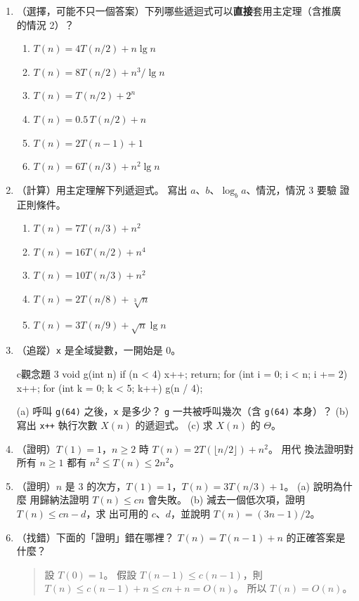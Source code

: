 \begin{enumerate}
\item （選擇，可能不只一個答案）下列哪些遞迴式可以\textbf{直接}套用主定理（含推廣
的情況 2）？
\begin{enumerate}
\item $T(n) = 4T(n/2) + n \lg n$
\item $T(n) = 8T(n/2) + n^3 / \lg n$
\item $T(n) = T(n/2) + 2^n$
\item $T(n) = 0.5\, T(n/2) + n$
\item $T(n) = 2T(n-1) + 1$
\item $T(n) = 6T(n/3) + n^2 \lg n$
\end{enumerate}

\item （計算）用主定理解下列遞迴式。 寫出 $a$、$b$、$\log_b a$、情況，情況 3 要驗
證正則條件。
\begin{enumerate}
\item $T(n) = 7T(n/3) + n^2$
\item $T(n) = 16T(n/2) + n^4$
\item $T(n) = 10T(n/3) + n^2$
\item $T(n) = 2T(n/8) + \sqrt[3]{n}$
\item $T(n) = 3T(n/9) + \sqrt{n} \lg n$
\end{enumerate}

\item （追蹤）\texttt{x} 是全域變數，一開始是 $0$。
\begin{code}{c}{觀念題 3}
void g(int n)
{
    if (n < 4) {
        x++;
        return;
    }
    for (int i = 0; i < n; i += 2)
        x++;
    for (int k = 0; k < 5; k++)
        g(n / 4);
}
\end{code}
(a) 呼叫 \texttt{g(64)} 之後，\texttt{x} 是多少？ \texttt{g} 一共被呼叫幾次（含
\texttt{g(64)} 本身）？ (b) 寫出 \texttt{x++} 執行次數 $X(n)$ 的遞迴式。 (c) 求
$X(n)$ 的 $\Theta$。

\item （證明）$T(1) = 1$，$n \ge 2$ 時 $T(n) = 2T(\lfloor n/2 \rfloor) + n^2$。 用代
換法證明對所有 $n \ge 1$ 都有 $n^2 \le T(n) \le 2n^2$。

\item （證明）$n$ 是 $3$ 的次方，$T(1) = 1$，$T(n) = 3T(n/3) + 1$。 (a) 說明為什麼
用歸納法證明 $T(n) \le cn$ 會失敗。 (b) 減去一個低次項，證明 $T(n) \le cn - d$，求
出可用的 $c$、$d$，並說明 $T(n) = (3n - 1)/2$。

\item （找錯）下面的「證明」錯在哪裡？ $T(n) = T(n-1) + n$ 的正確答案是什麼？
\begin{quote}
設 $T(0) = 1$。 假設 $T(n-1) \le c(n - 1)$，則 $T(n) \le c(n-1) + n \le cn + n =
O(n)$。 所以 $T(n) = O(n)$。
\end{quote}


\end{enumerate}
